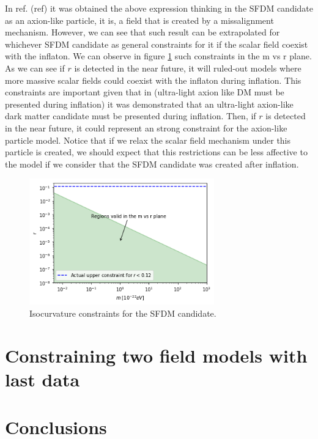 \documentclass[a4paper,fleqn,usenatbib,useAMS]{mnras}
\begin{document}
In ref. (ref) it was obtained the above expression thinking in the SFDM candidate as an axion-like particle, it is, a field that is created by a missalignment mechanism. However, we can see that such result can be extrapolated for whichever SFDM candidate as general constraints for it if the scalar field coexist with the inflaton. We can observe in figure \ref{constraintsSFDM} such constraints in the m vs r plane. As we can see if $r$ is detected in the near future, it will ruled-out models where more massive scalar fields could coexist with the inflaton during inflation. This constraints are important given that in (ultra-light axion like DM must be presented during inflation) it was demonstrated that an ultra-light axion-like dark matter candidate must be presented during inflation. Then, if $r$ is detected in the near future, it could represent an strong constraint for the axion-like particle model. Notice that if we relax the scalar field mechanism under this particle is created, we should expect that this restrictions can be less affective to the model if we consider that the SFDM candidate was created after inflation. 

\begin{figure}
\includegraphics[width=8cm]{SFDMconstraints.png}
\caption{Isocurvature constraints for the SFDM candidate.}\label{constraintsSFDM}
\end{figure}
\section{Constraining two field models with last data}
\section{Conclusions}
\appendix
\end{document}
